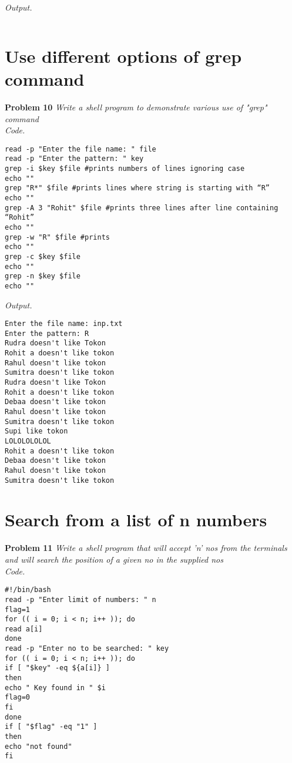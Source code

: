 \documentclass[12pt]{article}
\begin{document}
\textit{Output.}
\begin{lstlisting}

\end{lstlisting}

\section{Use different options of grep command}

\textbf{Problem 10} \textit{Write a shell program to demonstrate various use of "grep" command}\\

\textit{Code.}

\begin{lstlisting}
read -p "Enter the file name: " file
read -p "Enter the pattern: " key
grep -i $key $file #prints numbers of lines ignoring case
echo ""
grep "R*" $file #prints lines where string is starting with “R”
echo ""
grep -A 3 "Rohit" $file #prints three lines after line containing “Rohit”
echo ""
grep -w "R" $file #prints
echo ""
grep -c $key $file
echo ""
grep -n $key $file
echo ""
\end{lstlisting}

\textit{Output.}
\begin{lstlisting}
Enter the file name: inp.txt
Enter the pattern: R
Rudra doesn't like Tokon
Rohit a doesn't like tokon
Rahul doesn't like tokon
Sumitra doesn't like tokon
Rudra doesn't like Tokon
Rohit a doesn't like tokon
Debaa doesn't like tokon
Rahul doesn't like tokon
Sumitra doesn't like tokon
Supi like tokon
LOLOLOLOLOL
Rohit a doesn't like tokon
Debaa doesn't like tokon
Rahul doesn't like tokon
Sumitra doesn't like tokon
\end{lstlisting}

\section{Search from a list of n numbers}

\textbf{Problem 11} \textit{Write a shell program that will accept 'n' nos from the terminals and will search the position of a given no in the supplied nos}\\

\textit{Code.}

\begin{lstlisting}
#!/bin/bash
read -p "Enter limit of numbers: " n
flag=1
for (( i = 0; i < n; i++ )); do
read a[i]
done
read -p "Enter no to be searched: " key
for (( i = 0; i < n; i++ )); do
if [ "$key" -eq ${a[i]} ]
then
echo " Key found in " $i
flag=0
fi
done
if [ "$flag" -eq "1" ]
then
echo "not found"
fi
\end{lstlisting}
\end{document}
